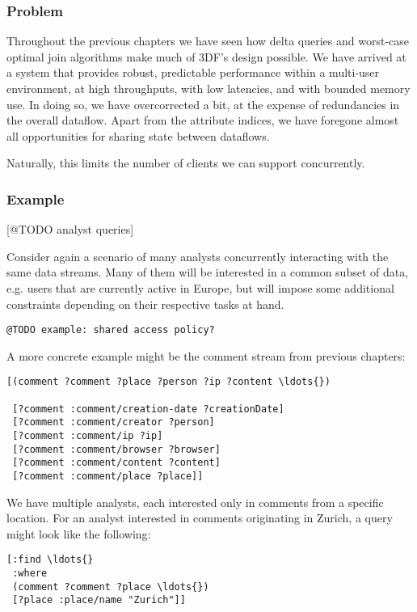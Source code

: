 \documentclass[../catalog.tex]{subfiles}
\begin{document}
\subsubsection{Problem}

Throughout the previous chapters we have seen how delta queries and
worst-case optimal join algorithms make much of 3DF's design
possible. We have arrived at a system that provides robust,
predictable performance within a multi-user environment, at high
throughputs, with low latencies, and with bounded memory use. In doing
so, we have overcorrected a bit, at the expense of redundancies in the
overall dataflow. Apart from the attribute indices, we have foregone
almost all opportunities for sharing state between dataflows.

Naturally, this limits the number of clients we can support
concurrently.

\subsubsection{Example}

[@TODO analyst queries]

Consider again a scenario of many analysts concurrently interacting
with the same data streams. Many of them will be interested in a
common subset of data, e.g. users that are currently active in Europe,
but will impose some additional constraints depending on their
respective tasks at hand.

\texttt{@TODO example: shared access policy?}

A more concrete example might be the comment stream from previous
chapters:

\begin{verbatim}
[(comment ?comment ?place ?person ?ip ?content \ldots{})

 [?comment :comment/creation-date ?creationDate]
 [?comment :comment/creator ?person]
 [?comment :comment/ip ?ip]
 [?comment :comment/browser ?browser]
 [?comment :comment/content ?content]
 [?comment :comment/place ?place]]
\end{verbatim}

We have multiple analysts, each interested only in comments from a
specific location. For an analyst interested in comments originating
in Zurich, a query might look like the following:

\begin{verbatim}
[:find \ldots{}
 :where
 (comment ?comment ?place \ldots{})
 [?place :place/name "Zurich"]]
\end{verbatim}
\end{document}
